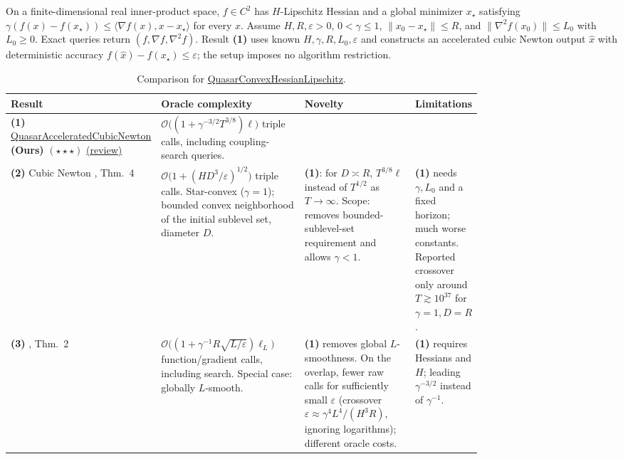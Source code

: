 \begin{table}[tp]
\centering
\caption{Comparison for \href{https://github.com/k3nfalt/longtails/blob/main/LongTails/Setups/QuasarConvexHessianLipschitz.lean}{QuasarConvexHessianLipschitz}.}\label{tab:QuasarConvexHessianLipschitz}
\parbox{\linewidth}{\footnotesize On a finite-dimensional real inner-product space, $f\in C^2$ has $H$-Lipschitz Hessian and a global minimizer $x_\star$ satisfying $\gamma(f(x)-f(x_\star))\leq\langle\nabla f(x),x-x_\star\rangle$ for every $x$. Assume $H,R,\varepsilon>0$, $0<\gamma\leq1$, $\|x_0-x_\star\|\leq R$, and $\|\nabla^2 f(x_0)\|\leq L_0$ with $L_0\geq0$. Exact queries return $(f,\nabla f,\nabla^2 f)$. Result \textbf{(1)} uses known $H,\gamma,R,L_0,\varepsilon$ and constructs an accelerated cubic Newton output $\widehat x$ with deterministic accuracy $f(\widehat x)-f(x_\star)\leq\varepsilon$; the setup imposes no algorithm restriction.}\par\smallskip
\begin{threeparttable}
\footnotesize
\setlength{\tabcolsep}{4pt}\renewcommand{\arraystretch}{1.25}
\begin{tabularx}{\linewidth}{@{}>{\raggedright\arraybackslash}p{0.20\linewidth}>{\raggedright\arraybackslash}p{0.32\linewidth}>{\raggedright\arraybackslash}p{0.25\linewidth}>{\raggedright\arraybackslash}X@{}}
\toprule
\textbf{Result} & \textbf{Oracle complexity} & \textbf{Novelty} & \textbf{Limitations} \\
\midrule
\textbf{(1)} \href{https://github.com/k3nfalt/longtails/blob/main/LongTails/Theorems/QuasarAcceleratedCubicNewton.lean}{Quasar\allowbreak Accelerated\allowbreak Cubic\allowbreak Newton} \textbf{(Ours)} $(\star\star\star)$ \href{https://github.com/k3nfalt/longtails/blob/main/scripts/reviews/QuasarAcceleratedCubicNewton.md}{(review)} & $\mathcal{O}\bigl((1+\gamma^{-3/2}T^{3/8})\ell\bigr)$ triple calls, including coupling-search queries. & & \\
\midrule[1.2pt]
\textbf{(2)} Cubic Newton \citep{qchNP2006}, Thm.~4 & $\mathcal{O}\bigl(1+(HD^3/\varepsilon)^{1/2}\bigr)$ triple calls. Star-convex ($\gamma=1$); bounded convex neighborhood of the initial sublevel set, diameter $D$. & \textbf{(1)}: for $D\asymp R$, $T^{3/8}\ell$ instead of $T^{1/2}$ as $T\to\infty$. Scope: removes bounded-sublevel-set requirement and allows $\gamma<1$. & \textbf{(1)} needs $\gamma,L_0$ and a fixed horizon; much worse constants. Reported crossover only around $T\gtrsim10^{37}$ for $\gamma=1,D=R$. \\
\midrule
\textbf{(3)} \citep{qchHSS2020}, Thm.~2 & $\mathcal{O}\bigl((1+\gamma^{-1}R\sqrt{L/\varepsilon})\ell_L\bigr)$ function/gradient calls, including search. Special case: globally $L$-smooth. & \textbf{(1)} removes global $L$-smoothness. On the overlap, fewer raw calls for sufficiently small $\varepsilon$ (crossover $\varepsilon\approx\gamma^4L^4/(H^3R)$, ignoring logarithms); different oracle costs. & \textbf{(1)} requires Hessians and $H$; leading $\gamma^{-3/2}$ instead of $\gamma^{-1}$. \\

\end{tabularx}
\end{threeparttable}
\end{table}
